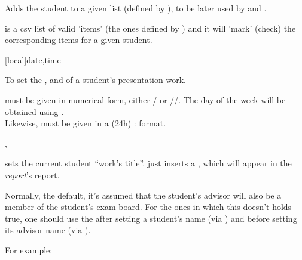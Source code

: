 \documentclass[article,nofontwarning,nogeometry,english,tocdepth=3,secdepth=3]{ufrgscca} %
\begin{document}
\begin{codedescribe}[code,new=2023/12/04]{\studentaddtolist}
	\begin{codesyntax}%
	\end{codesyntax}
Adds the student to a given list (defined by ), to be later used by \tsobj{\sortstudentlist} and \tsobj{\tcreport}.
\end{codedescribe}

\begin{codedescribe}{\checklist}
    \begin{codesyntax}%
    \end{codesyntax}
     is a csv list of valid 'items' (the ones defined by \tsmacro{\checkdef}{}) and it will 'mark' (check) the corresponding items for a given student.
\end{codedescribe}


\begin{codedescribe}[code,update=2023/11/29]{\timeslot}
	\begin{codesyntax}%
		\tsmacro{\timeslot}[local]{date,time}
	\end{codesyntax}
To set the ,  and  of a student's presentation work.
\end{codedescribe}

\begin{tsremark}
 must be given in numerical form, either / or //. The day-of-the-week will be obtained  using .\\ Likewise,  must be given in a (24h) :  format.
\end{tsremark}



\begin{codedescribe}[code,update=2023/11/18]{\worktitle,\studentremark}
	\begin{codesyntax}%
		\tsmacro{\worktitle}{title}
		\tsmacro{\studentremark}{remark}
	\end{codesyntax}
\end{codedescribe}
\tsmacro{\worktitle}{} sets the current student “work's title”. \tsmacro{\studentremark}{} just inserts a , which will appear in the \emph{report}'s report.


\begin{codedescribe}[code,update=2023/11/18]{\distinctboard}
	\begin{codesyntax}%
		\tsmacro{\distinctboard}{}
	\end{codesyntax}
Normally, the default, it's assumed that the student's advisor will also be a member of the student's exam board. For the ones in which this doesn't holds true, one should use the \tsmacro{\distinctboard}{} after setting a student's name (via \tsmacro{\student}{}) and before setting its advisor name (via \tsmacro{\advisor}{}). 
\end{codedescribe}
For example:
\end{document}
